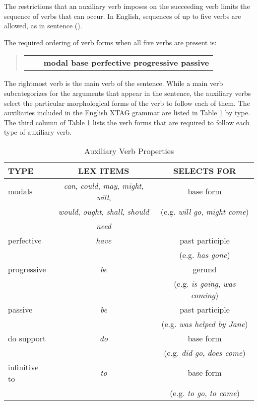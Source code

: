 \noindent The restrictions that an auxiliary verb imposes on the succeeding verb limits
the sequence of verbs that can occur.  In English, sequences of up to five
verbs are allowed, as in sentence ().


\noindent 
The required ordering of verb forms when all five verbs are present is:

\begin{quote}
\begin{tabular}{ccl}
& & {\bf modal base perfective progressive passive}
\end{tabular}
\end{quote}

\noindent
The rightmost verb is the main verb of the sentence.  While a main verb
subcategorizes for the arguments that appear in the sentence, the auxiliary
verbs select the particular morphological forms of the verb to follow each of
them.  The auxiliaries included in the English XTAG grammar are listed in Table
\ref{aux-table} by type.  The third column of Table \ref{aux-table} lists the
verb forms that are required to follow each type of auxiliary verb.

\vspace*{0.2in}

\begin{table}[ht]
\centering
\begin{tabular}{|l|c|c|}  
\hline
TYPE&LEX ITEMS&SELECTS FOR\\     
\hline
modals & {\it can}, {\it could}, {\it may}, {\it might}, {\it will}, & base form\footnotemark
\\ & {\it would}, {\it ought}, {\it shall}, {\it should} & (e.g. {\it will
go}, {\it might come})\\ & {\it need} &\\
\hline
perfective & {\it have} & past participle\\
& & (e.g. {\it has gone})\\  
\hline
progressive & {\it be} & gerund\\
& & (e.g. {\it is going}, {\it was coming})\\  
\hline
passive & {\it be} & past participle\\
& & (e.g. {\it was helped by Jane})\\  
\hline
do support & {\it do} &base form\\
& & (e.g. {\it did go}, {\it does come})\\  
\hline
infinitive to & {\it to} & base form\\
& & (e.g. {\it to go}, {\it to come})\\  
\hline
\end{tabular}
\caption{Auxiliary Verb Properties}
\label{aux-table}
\end{table}

